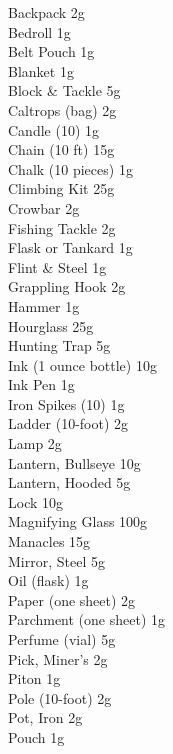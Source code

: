 \documentclass[10pt,twoside]{article}
\begin{document}
\begin{multicols}{3}
\small
Backpack \dotfill 2g \\
Bedroll \dotfill 1g \\
Belt Pouch \dotfill 1g \\
Blanket \dotfill 1g \\
Block \& Tackle \dotfill 5g \\
Caltrops (bag) \dotfill 2g \\
Candle (10) \dotfill 1g \\
Chain (10 ft) \dotfill 15g \\
Chalk (10 pieces) \dotfill 1g \\
Climbing Kit \dotfill 25g \\
Crowbar \dotfill 2g \\
Fishing Tackle \dotfill 2g \\
Flask or Tankard \dotfill 1g \\
Flint \& Steel \dotfill 1g \\
Grappling Hook \dotfill 2g \\
Hammer \dotfill 1g \\
Hourglass \dotfill 25g \\
Hunting Trap \dotfill 5g \\
Ink (1 ounce bottle) \dotfill 10g \\
Ink Pen \dotfill 1g \\
Iron Spikes (10) \dotfill 1g \\
Ladder (10-foot) \dotfill 2g \\
Lamp \dotfill 2g \\
Lantern, Bullseye \dotfill 10g \\
Lantern, Hooded \dotfill 5g \\
Lock \dotfill 10g \\
Magnifying Glass \dotfill 100g \\
Manacles \dotfill 15g \\
Mirror, Steel \dotfill 5g \\
Oil (flask) \dotfill 1g \\
Paper (one sheet) \dotfill 2g \\
Parchment (one sheet) \dotfill 1g \\
Perfume (vial) \dotfill 5g \\
Pick, Miner's \dotfill 2g \\
Piton \dotfill 1g \\
Pole (10-foot) \dotfill 2g \\
Pot, Iron \dotfill 2g \\
Pouch \dotfill 1g \\

\end{multicols}
\end{document}
